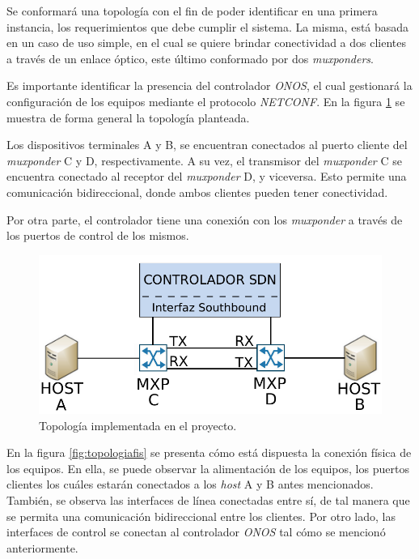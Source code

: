 Se conformará una topología con el fin de poder identificar en una primera instancia, los requerimientos que debe cumplir el sistema. La misma, está basada en un caso de uso simple, en el cual se quiere brindar conectividad a dos clientes a través de un enlace óptico, este último conformado por dos \textit{muxponders}.  

Es importante identificar la presencia del controlador \textit{ONOS}, el cual gestionará la configuración de los equipos mediante el protocolo \textit{NETCONF}. En la figura \ref{fig:topologia} se muestra de forma general la topología planteada. 

Los dispositivos terminales A y B, se encuentran conectados al puerto cliente del \textit{muxponder} C y D, respectivamente. A su vez, el transmisor del \textit{muxponder} C se encuentra conectado al receptor del \textit{muxponder} D, y viceversa. Esto permite una comunicación bidireccional, donde ambos clientes pueden tener conectividad. 

Por otra parte, el controlador tiene una conexión con los \textit{muxponder} a través de los puertos de control de los mismos. 

\begin{figure}[H]
    \centering
    \includegraphics[scale=0.68]{Figures/topologia.pdf}
    \caption{Topología implementada en el proyecto.}
    \label{fig:topologia}
  \end{figure}


En la figura \ref{fig:topologiafis} se presenta cómo está dispuesta la conexión física de los equipos. En ella, se puede observar la alimentación de los equipos, los puertos clientes los cuáles estarán conectados a los \textit{host} A y B antes mencionados. También, se observa las interfaces de línea conectadas entre sí, de tal manera que se permita una comunicación bidireccional entre los clientes. Por otro lado, las interfaces de control se conectan al controlador \textit{ONOS} tal cómo se mencionó anteriormente. 

